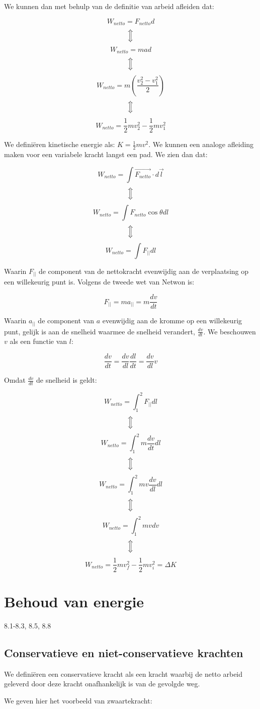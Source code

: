 \documentclass[12pt,a4paper]{article}
\newcommand{\Luda}{\Big\Updownarrow}
\begin{document}
    We kunnen dan met behulp van de definitie van arbeid afleiden dat:
    
    $$W_{netto} = F_{netto}d$$
    $$\Luda$$
    $$W_{netto} = mad$$
    $$\Luda$$
    $$W_{netto} = m\left( \frac{v_{2}^{2} - v_{1}^{2}}{2} \right)$$
    $$\Luda$$
    $$W_{netto} = \frac{1}{2} mv_{2}^{2} - \frac{1}{2} mv_{1}^{2} $$
    
    We definiëren kinetische energie als: $K = \frac{1}{2}mv^{2}$. We kunnen een analoge afleiding maken voor
    een variabele kracht langst een pad. We zien dan dat:
    
    $$W_{netto} = \int \vec{F_{netto}} \cdot d\vec{l}$$
    $$\Luda$$
    $$W_{netto} = \int F_{netto}\cos{\theta}dl$$
    $$\Luda$$
    $$W_{netto} = \int F_{||}dl$$

    Waarin $F_{||}$ de component van de nettokracht evenwijdig aan de verplaatsing op een willekeurig punt is. Volgens de tweede wet van Netwon is:

    $$F_{||} = ma_{||} = m\frac{dv}{dt}$$

    Waarin $a_{||}$ de component van $a$ evenwijdig aan de kromme op een willekeurig punt, gelijk is aan de snelheid waarmee de snelheid verandert, $\frac{dv}{dt}$. 
    We beschouwen $v$ als een functie van $l$:

    $$\frac{dv}{dt} = \frac{dv}{dl} \frac{dl}{dt} = \frac{dv}{dl}v$$

    Omdat $\frac{dv}{dt}$ de snelheid is geldt:

    $$W_{netto} = \int_{1}^{2} F_{||}dl$$
    $$\Luda$$
    $$W_{netto} = \int_{1}^{2} m\frac{dv}{dt}dl$$
    $$\Luda$$
    $$W_{netto} = \int_{1}^{2} mv\frac{dv}{dl}dl$$
    $$\Luda$$
    $$W_{netto} = \int_{1}^{2} mvdv$$
    $$\Luda$$
    $$W_{netto} = \frac{1}{2} mv_{f}^{2} - \frac{1}{2}mv_{i}^{2} = \Delta K$$
    
    \section{Behoud van energie}
    8.1-8.3, 8.5, 8.8
    
    \subsection{Conservatieve en niet-conservatieve krachten}
    We definiëren een conservatieve kracht als een kracht waarbij de netto arbeid geleverd door deze kracht
    onafhankelijk is van de gevolgde weg. 
    
    We geven hier het voorbeeld van zwaartekracht:
    
\end{document}
